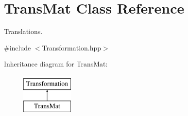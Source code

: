 \hypertarget{class_trans_mat}{\section{Trans\-Mat Class Reference}
\label{class_trans_mat}
}


Translations.  




{\ttfamily \#include $<$Transformation.\-hpp$>$}

Inheritance diagram for Trans\-Mat\-:\begin{figure}[H]
\begin{center}
\leavevmode
\includegraphics[height=2.000000cm]{class_trans_mat}
\end{center}
\end{figure}

